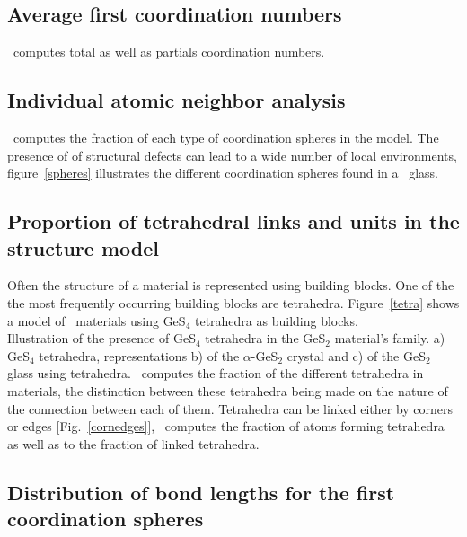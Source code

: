 \subsection{Average first coordination numbers}

\atomes\ computes total as well as partials coordination numbers. 

\subsection{Individual atomic neighbor analysis}

\atomes\ computes the fraction of each type of coordination spheres in the model.
The presence of of structural defects can lead to a wide number of local environments, figure~\ref{spheres} illustrates the different coordination spheres found in a \ges\ glass. 
\spheresfig
\clearpage

\subsection{Proportion of tetrahedral links and units in the structure model}

Often the structure of a material is represented using building blocks.
One of the the most frequently occurring building blocks are tetrahedra. 
Figure~\ref{tetra} shows a model of \ges\ materials using GeS$_4$ tetrahedra as building blocks. \\ 
{Illustration of the presence of GeS$_4$ tetrahedra in the GeS$_2$ material's family.
a) GeS$_4$ tetrahedra, representations b) of the $\alpha$-GeS$_2$ crystal and c) of the GeS$_2$ glass using tetrahedra.}
\laf \atomes\ computes the fraction of the different tetrahedra in materials, the distinction between these tetrahedra being made on the nature of the connection between each of them. 
Tetrahedra can be linked either by corners or edges [Fig.~\ref{cornedges}], \atomes\ computes the fraction of atoms forming tetrahedra as well as to the fraction of linked tetrahedra. \\
\cornedgefig

\newpage
\subsection{Distribution of bond lengths for the first coordination spheres}

